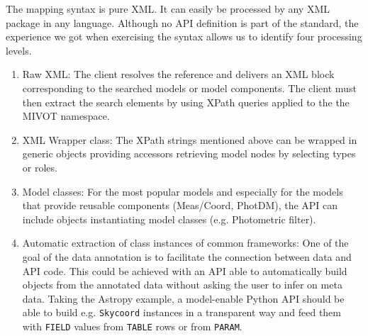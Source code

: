 The mapping syntax is pure XML. It can easily be processed by any XML package in any language.
Although no API definition is part of the standard, the experience we got when exercising the syntax allows us to identify 
four processing levels.

\begin{enumerate} 
  \item Raw XML: The client resolves the reference and delivers an XML block corresponding to the searched models or model components. 
        The client must then extract the search elements by using XPath queries applied to the the MIVOT namespace.
  \item XML Wrapper class: The XPath strings mentioned above can be wrapped in generic objects providing accessors retrieving model nodes by selecting types or roles. 
  \item Model classes: For the most popular models and especially for the models that provide reusable components (Meas/Coord, PhotDM), the API can include objects instantiating model classes (e.g. Photometric filter).
  \item Automatic extraction of class instances of common frameworks: One of the goal of the data annotation is to facilitate the connection between data and API code. This could be achieved with an API able to automatically build objects from the annotated data without asking the user to infer on meta data. Taking the Astropy example, a model-enable Python API should be able to build e.g. \texttt{Skycoord} instances in a transparent way and feed them with \texttt{FIELD} values from \texttt{TABLE} rows or from \texttt{PARAM}.
 \end{enumerate}

